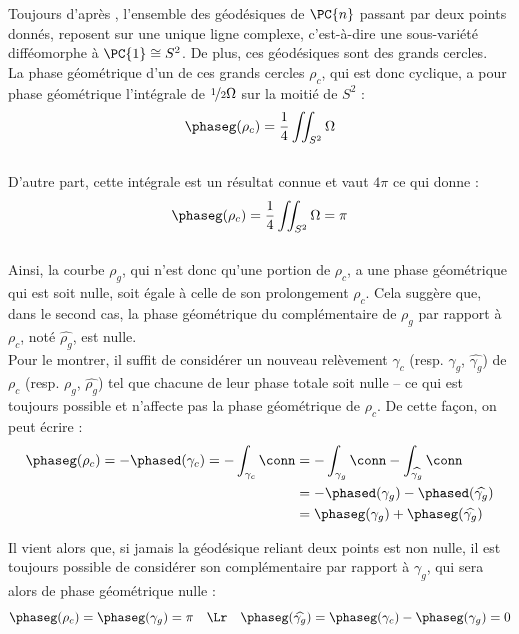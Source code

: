 Toujours d'après \cite[sec.~3.E]{besse_manifolds_1978}, l'ensemble des géodésiques de $\PC{n}$ passant par deux points donnés, reposent sur une unique ligne complexe, c'est-à-dire une sous-variété difféomorphe à $\PC{1}\cong S^2$. De plus, ces géodésiques sont des grands cercles.
\\

La phase géométrique d'un de ces grands cercles $\rho_c$, qui est donc cyclique, a pour phase géométrique l'intégrale de $\nicefrac{1}{2} \Omega$ sur la moitié de $S^2$ :
\[\phaseg(\rho_c) = \frac{1}{4} \iint_{S^2} \Omega\]
\\
D'autre part, cette intégrale est un résultat connue \cite[p. 119]{huybrechts_complex_2005} et vaut $4\pi$ ce qui donne :
\[\phaseg(\rho_c) = \frac{1}{4} \iint_{S^2} \Omega = \pi\]
\\
Ainsi, la courbe $\rho_g$, qui n'est donc qu'une portion de $\rho_c$, a une phase géométrique qui est soit nulle, soit égale à celle de son prolongement $\rho_c$. 
Cela suggère que, dans le second cas, la phase géométrique du complémentaire de $\rho_g$ par rapport à $\rho_c$, noté $\widehat{\rho_g}$, est nulle. 
\\
Pour le montrer, il suffit de considérer un nouveau relèvement $\gamma_c$ (resp. $\gamma_g$, $\widehat{\gamma_g}$) de $\rho_c$ (resp. $\rho_g$, $\widehat{\rho_g}$) tel que chacune de leur phase totale soit nulle -- ce qui est toujours possible et n'affecte pas la phase géométrique de $\rho_c$. De cette façon, on peut écrire :
\begin{align*}
\phaseg(\rho_c) = -\phased(\gamma_c) = -\int_{\gamma_c}\conn 
&= -\int_{\gamma_g}\conn -\int_{\widehat{\gamma_g}}\conn \\
&= -\phased(\gamma_g) - \phased(\widehat{\gamma_g}) \\
&= \phaseg(\gamma_g) + \phaseg(\widehat{\gamma_g})
\end{align*}
\skipl

Il vient alors que, si jamais la géodésique reliant deux points est non nulle, il est toujours possible de considérer son complémentaire par rapport à $\gamma_g$, qui sera alors de phase géométrique nulle :
\[\phaseg(\rho_c) = \phaseg(\gamma_g) = \pi \quad \Lr\quad \phaseg(\widehat{\gamma_g}) = \phaseg(\gamma_c) - \phaseg(\gamma_g) = 0\]
\\


